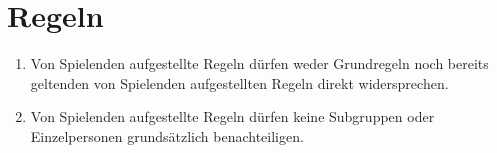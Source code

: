 \section{Regeln}
\begin{enumerate}[label={(\arabic*)}]
	\item
	Von Spielenden aufgestellte Regeln dürfen weder Grundregeln noch bereits geltenden von Spielenden aufgestellten Regeln direkt widersprechen.
	
	\item
	Von Spielenden aufgestellte Regeln dürfen keine Subgruppen oder Einzelpersonen grundsätzlich benachteiligen.
\end{enumerate}
